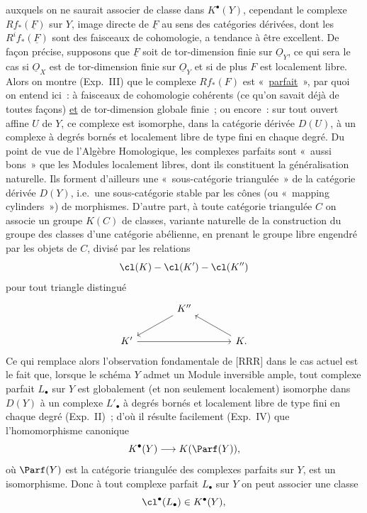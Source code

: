 auxquels on ne saurait associer de classe dans $K^\bullet(Y)$, cependant le complexe $Rf_*(\underline F)$ sur $Y$, image directe de $\underline F$ au sens des catégories dérivées, dont les $R^if_*(\underline F)$ sont des faisceaux de cohomologie, a tendance à être excellent. De façon précise, supposons que $\underline F$ soit de tor-dimension finie sur $\underline O_Y$, ce qui sera le cas si $\underline O_X$ est de tor-dimension finie sur $\underline O_Y$ et si de plus $F$ est localement libre. Alors on montre (Exp.\ III) que le complexe $Rf_*(F)$ est «~\underline{parfait}~», par quoi on entend ici~: à faisceaux de cohomologie cohérents (ce qu'on savait déjà de toutes façons) \underline{et} de tor-dimension globale finie~; ou encore~: sur tout ouvert affine $U$ de $Y$, ce complexe est isomorphe, dans la catégorie dérivée $D(U)$, à un complexe à degrés bornés et localement libre de type fini en chaque degré. Du point de vue de l'Algèbre Homologique, les complexes parfaits sont «~aussi bons~» que les Modules localement libres, dont ils constituent la généralisation naturelle. Ils forment d'ailleurs une «~sous-catégorie triangulée~» de la catégorie dérivée $D(Y)$, i.e.\ une sous-catégorie stable par les cônes (ou «~mapping cylinders~») de morphismes. D'autre part, à toute catégorie triangulée $C$ on associe un groupe $K(C)$ de classes, variante naturelle de la construction du groupe des classes d'une catégorie abélienne, en prenant le groupe libre engendré par les objets de $C$, divisé par les relations
\[
\cl(K)-\cl(K')-\cl(K'')
\]
pour tout triangle distingué
\[
\begin{tikzcd}[column sep=large]
 & K'' \arrow[dl] & \\
K' \arrow[rr] & & K \arrow[ul] .
\end{tikzcd}
\]
Ce qui remplace alors l'observation fondamentale de [RRR] dans le cas actuel est le fait que, lorsque le schéma $Y$ admet un Module inversible ample, tout complexe parfait $L_\bullet$ sur $Y$ est globalement (et non seulement localement) isomorphe dans $D(Y)$ à un complexe $L'_\bullet$ à degrés bornés et localement libre de type fini en chaque degré (Exp.\ II)~; d'où il résulte facilement (Exp.\ IV) que l'homomorphisme canonique
\[
K^\bullet(Y)\longrightarrow K(\Parf(Y)),
\]
où $\Parf(Y)$ est la catégorie triangulée des complexes parfaits sur $Y$, est un isomorphisme. Donc à tout complexe parfait $L_\bullet$ sur $Y$ on peut associer une classe
\[
\cl^\bullet(L_\bullet)\in K^\bullet(Y),
\]
